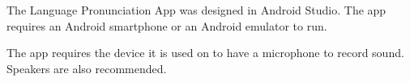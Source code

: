 The Language Pronunciation App was designed in Android Studio. The app requires an Android smartphone or an Android emulator to run.

The app requires the device it is used on to have a microphone to record sound. Speakers are also recommended.
